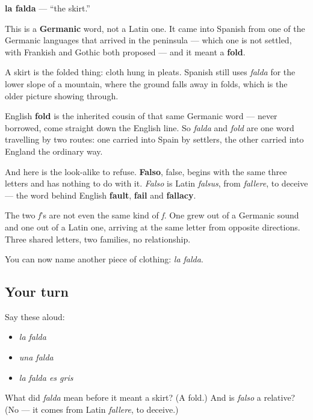 \begin{cousinweb}
\textbf{la falda} — \textquotedblleft{}the skirt.\textquotedblright{}

This is a \textbf{Germanic} word, not a Latin one. It came into Spanish from one of the Germanic languages that arrived in the peninsula — which one is not settled, with Frankish and Gothic both proposed — and it meant a \textbf{fold}.

A skirt is the folded thing: cloth hung in pleats. Spanish still uses \emph{falda} for the lower slope of a mountain, where the ground falls away in folds, which is the older picture showing through.

English \textbf{fold} is the inherited cousin of that same Germanic word — never borrowed, come straight down the English line. So \emph{falda} and \emph{fold} are one word travelling by two routes: one carried into Spain by settlers, the other carried into England the ordinary way.

And here is the look-alike to refuse. \textbf{Falso}, false, begins with the same three letters and has nothing to do with it. \emph{Falso} is Latin \emph{falsus}, from \emph{fallere}, to deceive — the word behind English \textbf{fault}, \textbf{fail} and \textbf{fallacy}.

The two \emph{f}'s are not even the same kind of \emph{f}. One grew out of a Germanic sound and one out of a Latin one, arriving at the same letter from opposite directions. Three shared letters, two families, no relationship.
\end{cousinweb}

\begin{grammarlens}[title={What you've built}]
You can now name another piece of clothing: \emph{la falda}.
\end{grammarlens}

\subsection*{Your turn}
Say these aloud:

\begin{itemize}
\raggedright
  \item \emph{la falda}
  \item \emph{una falda}
  \item \emph{la falda es gris}
\end{itemize}

\begin{tcolorbox}[breakable,colback=teal!4,colframe=teal!35!black,title={Before you move on}]
What did \emph{falda} mean before it meant a skirt? (A fold.) And is \emph{falso} a relative? (No — it comes from Latin \emph{fallere}, to deceive.)
\end{tcolorbox}
